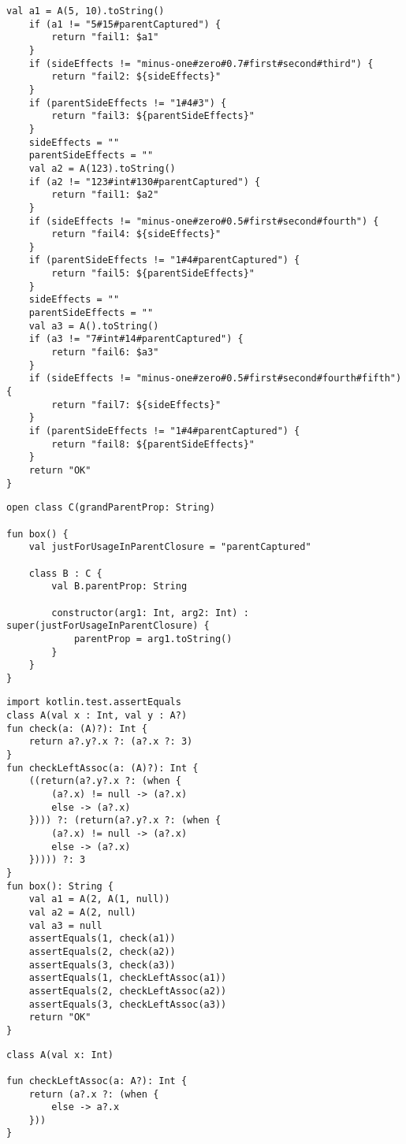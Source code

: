 \begin{lstlisting}[caption = Исходный код компиляторного теста localClasses.kt-384517712inheritance.kt]
    val a1 = A(5, 10).toString()
    if (a1 != "5#15#parentCaptured") {
        return "fail1: $a1"
    }
    if (sideEffects != "minus-one#zero#0.7#first#second#third") {
        return "fail2: ${sideEffects}"
    }
    if (parentSideEffects != "1#4#3") {
        return "fail3: ${parentSideEffects}"
    }
    sideEffects = ""
    parentSideEffects = ""
    val a2 = A(123).toString()
    if (a2 != "123#int#130#parentCaptured") {
        return "fail1: $a2"
    }
    if (sideEffects != "minus-one#zero#0.5#first#second#fourth") {
        return "fail4: ${sideEffects}"
    }
    if (parentSideEffects != "1#4#parentCaptured") {
        return "fail5: ${parentSideEffects}"
    }
    sideEffects = ""
    parentSideEffects = ""
    val a3 = A().toString()
    if (a3 != "7#int#14#parentCaptured") {
        return "fail6: $a3"
    }
    if (sideEffects != "minus-one#zero#0.5#first#second#fourth#fifth") {
        return "fail7: ${sideEffects}"
    }
    if (parentSideEffects != "1#4#parentCaptured") {
        return "fail8: ${parentSideEffects}"
    }
    return "OK"
}
\end{lstlisting}

\begin{lstlisting}[caption = Результат применения разработанного алгоритма редукции к файлу localClasses.kt-384517712inheritance.kt]
open class C(grandParentProp: String)

fun box() {
    val justForUsageInParentClosure = "parentCaptured"

    class B : C {
        val B.parentProp: String

        constructor(arg1: Int, arg2: Int) : super(justForUsageInParentClosure) {
            parentProp = arg1.toString()
        }
    }
}
\end{lstlisting}

\begin{lstlisting}[caption = Исходный код компиляторного теста safeCallWithElvis.kt-175330980.kt]
import kotlin.test.assertEquals
class A(val x : Int, val y : A?)
fun check(a: (A)?): Int {
    return a?.y?.x ?: (a?.x ?: 3)
}
fun checkLeftAssoc(a: (A)?): Int {
    ((return(a?.y?.x ?: (when {
        (a?.x) != null -> (a?.x)
        else -> (a?.x)
    }))) ?: (return(a?.y?.x ?: (when {
        (a?.x) != null -> (a?.x)
        else -> (a?.x)
    })))) ?: 3
}
fun box(): String {
    val a1 = A(2, A(1, null))
    val a2 = A(2, null)
    val a3 = null
    assertEquals(1, check(a1))
    assertEquals(2, check(a2))
    assertEquals(3, check(a3))
    assertEquals(1, checkLeftAssoc(a1))
    assertEquals(2, checkLeftAssoc(a2))
    assertEquals(3, checkLeftAssoc(a3))
    return "OK"
}
\end{lstlisting}

\begin{lstlisting}[caption = Результат применения разработанного алгоритма редукции к файлу safeCallWithElvis.kt-175330980.kt]
class A(val x: Int)

fun checkLeftAssoc(a: A?): Int {
    return (a?.x ?: (when {
        else -> a?.x
    }))
}
\end{lstlisting}
